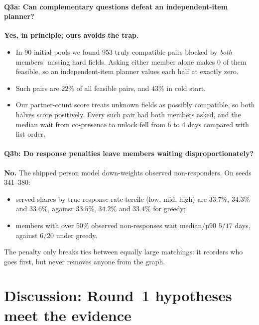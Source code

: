 \documentclass[10pt]{article}
\begin{document}
\paragraph{Q3a: Can complementary questions defeat an independent-item planner?} \textbf{Yes, in principle; ours avoids the trap.}
\begin{itemize}
\item In 90 initial pools we found 953 truly compatible pairs blocked by \emph{both} members' missing hard fields. Asking either member alone makes 0 of them feasible, so an independent-item planner values each half at exactly zero.
\item Such pairs are $22\%$ of all feasible pairs, and $43\%$ in cold start.
\item Our partner-count score treats unknown fields as possibly compatible, so both halves score positively. Every such pair had both members asked, and the median wait from co-presence to unlock fell from 6 to 4 days compared with list order.
\end{itemize}

\paragraph{Q3b: Do response penalties leave members waiting disproportionately?} \textbf{No.} The shipped person model down-weights observed non-responders. On seeds 341--380:
\begin{itemize}
\item served shares by true response-rate tercile (low, mid, high) are $33.7\%$, $34.3\%$ and $33.6\%$, against $33.5\%$, $34.2\%$ and $33.4\%$ for greedy;
\item members with over $50\%$ observed non-responses wait median/p90 $5/17$ days, against $6/20$ under greedy.
\end{itemize}
The penalty only breaks ties between equally large matchings: it reorders who goes first, but never removes anyone from the graph.

\section{Discussion: Round~1 hypotheses meet the evidence}\label{sec:discussion}
\end{document}
